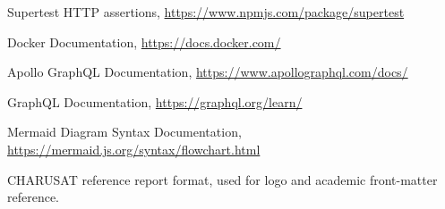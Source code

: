 \documentclass[12pt,a4paper]{report}
\begin{document}
\begin{enumerate}[label={[\arabic*]},leftmargin=0.3in,itemsep=2pt]
\item Supertest HTTP assertions, \url{https://www.npmjs.com/package/supertest}
\item Docker Documentation, \url{https://docs.docker.com/}
\item Apollo GraphQL Documentation, \url{https://www.apollographql.com/docs/}
\item GraphQL Documentation, \url{https://graphql.org/learn/}
\item Mermaid Diagram Syntax Documentation, \url{https://mermaid.js.org/syntax/flowchart.html}
\item CHARUSAT reference report format, used for logo and academic front-matter reference.
\end{enumerate}
\end{document}
